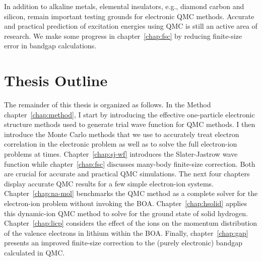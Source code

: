 In addition to alkaline metals, elemental insulators, e.g., diamond carbon and silicon, remain important testing grounds for electronic QMC methods. Accurate and practical prediction of excitation energies using QMC is still an active area of research. We make some progress in chapter~\ref{chap:fsc} by reducing finite-size error in bandgap calculations.

\section{Thesis Outline}
The remainder of this thesis is organized as follows. In the Method chapter~\ref{chap:method}, I start by introducing the effective one-particle electronic structure methods used to generate trial wave function for QMC methods.
I then introduce the Monte Carlo methods that we use to accurately treat electron correlation in the electronic problem as well as to solve the full electron-ion problems at times.
Chapter~\ref{chap:sj-wf} introduces the Slater-Jastrow wave function while chapter~\ref{chap:fsc} discusses many-body finite-size correction.
Both are crucial for accurate and practical QMC simulations.
The next four chapters display accurate QMC results for a few simple electron-ion systems.
Chapter~\ref{chap:na-mol} benchmarks the QMC method as a complete solver for the electron-ion problem without invoking the BOA.
Chapter~\ref{chap:hsolid} applies this dynamic-ion QMC method to solve for the ground state of solid hydrogen.
Chapter~\ref{chap:licp} considers the effect of the ions on the momentum distribution of the valence electrons in lithium within the BOA.
Finally, chapter~\ref{chap:gap} presents an improved finite-size correction to the (purely electronic) bandgap calculated in QMC.